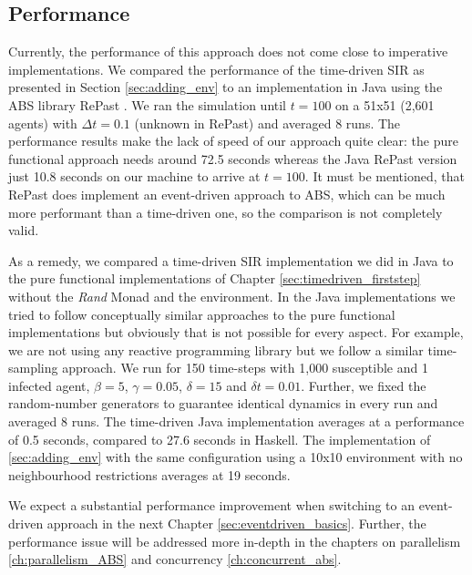 \subsection{Performance}
Currently, the performance of this approach does not come close to imperative implementations. We compared the performance of the time-driven SIR as presented in Section \ref{sec:adding_env} to an implementation in Java using the ABS library RePast \cite{north_complex_2013}. We ran the simulation until $t = 100$ on a 51x51 (2,601 agents) with $\Delta t = 0.1$ (unknown in RePast) and averaged 8 runs. The performance results make the lack of speed of our approach quite clear: the pure functional approach needs around 72.5 seconds whereas the Java RePast version just 10.8 seconds on our machine to arrive at $t = 100$. It must be mentioned, that RePast does implement an event-driven approach to ABS, which can be much more performant \cite{meyer_event-driven_2014} than a time-driven one, so the comparison is not completely valid.

As a remedy, we compared a time-driven SIR implementation we did in Java to the pure functional implementations of Chapter \ref{sec:timedriven_firststep} without the \textit{Rand} Monad and the environment. In the Java implementations we tried to follow conceptually similar approaches to the pure functional implementations but obviously that is not possible for every aspect. For example, we are not using any reactive programming library but we follow a similar time-sampling approach. We run for 150 time-steps with 1,000 susceptible and 1 infected agent, $\beta = 5$, $\gamma = 0.05$, $\delta = 15$ and $\delta t = 0.01$. Further, we fixed the random-number generators to guarantee identical dynamics in every run and averaged 8 runs. The time-driven Java implementation averages at a performance of 0.5 seconds, compared to 27.6 seconds in Haskell. The implementation of \ref{sec:adding_env} with the same configuration using a 10x10 environment with no neighbourhood restrictions averages at 19 seconds.

We expect a substantial performance improvement when switching to an event-driven approach \cite{meyer_event-driven_2014} in the next Chapter \ref{sec:eventdriven_basics}. Further, the performance issue will be addressed more in-depth in the chapters on parallelism \ref{ch:parallelism_ABS} and concurrency \ref{ch:concurrent_abs}.